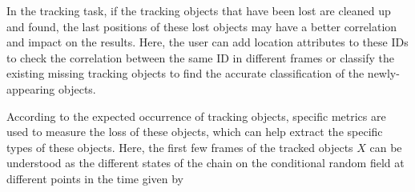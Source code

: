 \documentclass[trans]{IEEEtran}
\newcommand{\el}[1]{{\color{black}#1}}
\begin{document}
In the tracking task, if the tracking objects that have been lost are cleaned up and found,  \el{ the last positions of these lost objects may have a better correlation and impact} on the results. Here, the user can add location attributes to these IDs to check the correlation between the same ID in different frames or classify the existing missing tracking objects to find the accurate classification of the newly-appearing objects. 

According to the expected occurrence of tracking objects, specific metrics are used to measure the loss of these objects, which can help extract the specific types of these objects. Here, the first few frames of the tracked objects $X$ can be understood as the different states of the chain on the conditional random field at different points in the time given by
\end{document}
